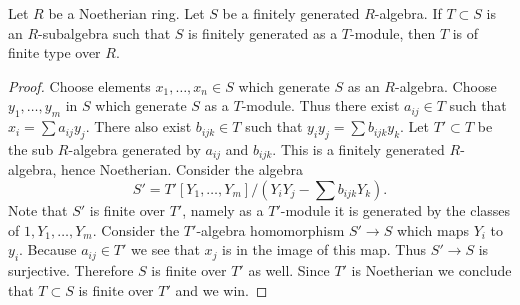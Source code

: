 \begin{lemma}
\label{lemma-Artin-Tate}
Let $R$ be a Noetherian ring. Let $S$ be a finitely
generated $R$-algebra. If $T \subset S$ is an $R$-subalgebra such
that $S$ is finitely generated as a $T$-module, then $T$ is of
finite type over $R$.
\end{lemma}

\begin{proof}
Choose elements $x_1, \ldots, x_n \in S$ which generate $S$ as an $R$-algebra.
Choose $y_1, \ldots, y_m$ in $S$ which generate $S$ as a $T$-module.
Thus there exist $a_{ij} \in T$ such that
$x_i = \sum a_{ij} y_j$. There also exist $b_{ijk} \in T$ such
that $y_i y_j = \sum b_{ijk} y_k$. Let $T' \subset T$ be the
sub $R$-algebra generated by $a_{ij}$ and $b_{ijk}$. This is a finitely
generated $R$-algebra, hence Noetherian. Consider the algebra
$$
S' = T'[Y_1, \ldots, Y_m]/(Y_i Y_j - \sum b_{ijk} Y_k).
$$
Note that $S'$ is finite over $T'$, namely as a $T'$-module it is
generated by the classes of $1, Y_1, \ldots, Y_m$.
Consider the $T'$-algebra homomorphism $S' \to S$ which maps
$Y_i$ to $y_i$. Because $a_{ij} \in T'$ we see that $x_j$ is
in the image of this map. Thus $S' \to S$ is surjective.
Therefore $S$ is finite over $T'$ as well. Since $T'$ is Noetherian
we conclude that $T \subset S$ is finite over $T'$ and
we win.
\end{proof}